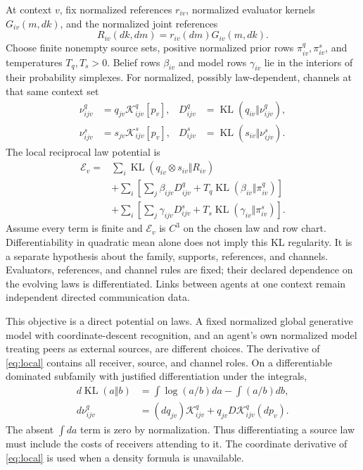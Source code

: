 \documentclass[11pt]{article}
\DeclareMathOperator{\KL}{KL}
\begin{document}
At context $v$, fix normalized references $r_{iv}$, normalized evaluator kernels $G_{iv}(m,dk)$, and the normalized joint references
\begin{equation}
 R_{iv}(dk,dm)=r_{iv}(dm)G_{iv}(m,dk).
\end{equation}
Choose finite nonempty source sets, positive normalized prior rows $\pi^q_{iv},\pi^s_{iv}$, and temperatures $T_q,T_s>0$. Belief rows $\beta_{iv}$ and model rows $\gamma_{iv}$ lie in the interiors of their probability simplexes. For normalized, possibly law-dependent, channels at that same context set
\begin{align}
 \nu^q_{ijv}&=q_{jv}\mathcal K^q_{ijv}[p_v],&
 D^q_{ijv}&=\KL(q_{iv}\Vert\nu^q_{ijv}),\\
 \nu^s_{ijv}&=s_{jv}\mathcal K^s_{ijv}[p_v],&
 D^s_{ijv}&=\KL(s_{iv}\Vert\nu^s_{ijv}).
\end{align}
The local reciprocal law potential is
\begin{align}
 \mathcal E_v={}&\sum_i\KL(q_{iv}\otimes s_{iv}\Vert R_{iv})\nonumber\\
 &+\sum_i\left[\sum_j\beta_{ijv}D^q_{ijv}
                   +T_q\KL(\beta_{iv}\Vert\pi^q_{iv})\right]\nonumber\\
 &+\sum_i\left[\sum_j\gamma_{ijv}D^s_{ijv}
                   +T_s\KL(\gamma_{iv}\Vert\pi^s_{iv})\right].
 \label{eq:local}
\end{align}
Assume every term is finite and $\mathcal E_v$ is $C^3$ on the chosen law and row chart. Differentiability in quadratic mean alone does not imply this KL regularity. It is a separate hypothesis about the family, supports, references, and channels. Evaluators, references, and channel rules are fixed; their declared dependence on the evolving laws is differentiated. Links between agents at one context remain independent directed communication data.

This objective is a direct potential on laws. A fixed normalized global generative model with coordinate-descent recognition, and an agent's own normalized model treating peers as external sources, are different choices. The derivative of \eqref{eq:local} contains all receiver, source, and channel roles. On a differentiable dominated subfamily with justified differentiation under the integrals,
\begin{align}
 d\KL(a\Vert b)&=\int\log(a/b)da-\int(a/b)db,\\
 d\nu^q_{ijv}&=(dq_{jv})\mathcal K^q_{ijv}
                 +q_{jv}D\mathcal K^q_{ijv}(dp_v).
 \label{eq:roles}
\end{align}
The absent $\int da$ term is zero by normalization. Thus differentiating a source law must include the costs of receivers attending to it. The coordinate derivative of \eqref{eq:local} is used when a density formula is unavailable.
\end{document}
